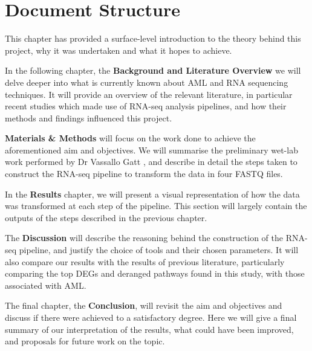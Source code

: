 

\section{Document Structure}
This chapter has provided a surface-level introduction to the theory behind this project, why it was undertaken and what it hopes to achieve.

In the following chapter, the \textbf{Background and Literature Overview} we will delve deeper into what is currently known about \ac{AML} and RNA sequencing techniques. It will provide an overview of the relevant literature, in particular recent studies which made use of RNA-seq analysis pipelines, and how their methods and findings influenced this project.

\textbf{Materials \& Methods} will focus on the work done to achieve the aforementioned aim and objectives. We will summarise the preliminary wet-lab work performed by Dr Vassallo Gatt  \citep{Gatt2016}, and describe in detail the steps taken to construct the RNA-seq pipeline to transform the data in four FASTQ files.

In the \textbf{Results} chapter, we will present a visual representation of how the data was transformed at each step of the pipeline. This section will largely contain the outputs of the steps described in the previous chapter.

The \textbf{Discussion} will describe the reasoning behind the construction of the RNA-seq pipeline, and justify the choice of tools and their chosen parameters. It will also compare our results with the results of previous literature, particularly comparing the top \ac{DEG}s and deranged pathways found in this study, with those associated with \ac{AML}. 

The final chapter, the \textbf{Conclusion}, will revisit the aim and objectives and discuss if there were achieved to a satisfactory degree. Here we will give a final summary of our interpretation of the results, what could have been improved, and proposals for future work on the topic.


